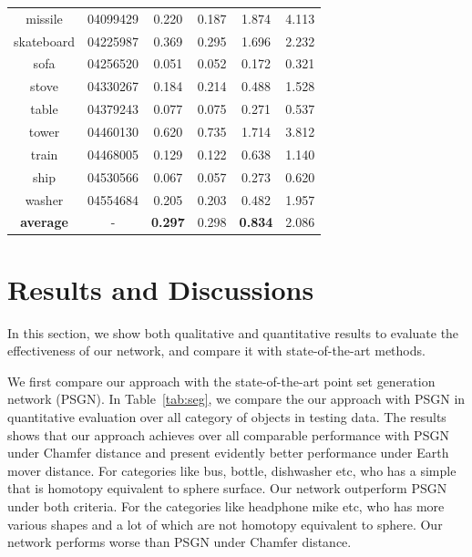 \begin{table}
\begin{tabular}{c c c c c c}
		missile & 04099429 & 0.220 & 0.187 & 1.874 & 4.113 \\
		skateboard & 04225987 & 0.369 & 0.295 & 1.696 & 2.232 \\
		sofa & 04256520 & 0.051 & 0.052 & 0.172 & 0.321 \\
		stove & 04330267 & 0.184 & 0.214 & 0.488 & 1.528 \\
		table & 04379243 & 0.077 & 0.075 & 0.271 & 0.537 \\
		tower & 04460130 & 0.620 & 0.735 & 1.714 & 3.812 \\
		train & 04468005 & 0.129 & 0.122 & 0.638 & 1.140 \\
		ship  & 04530566 & 0.067 & 0.057 & 0.273 & 0.620 \\
		washer &  04554684 & 0.205 & 0.203 & 0.482 & 1.957 \\
		\hline
		\textbf{average}   &     -     & \textbf{0.297} & 0.298 & \textbf{0.834} & 2.086\\
		\hline
	\end{tabular}
\end{table}

\section{Results and Discussions}

In this section, we show both qualitative and quantitative results to evaluate the effectiveness of our network, and compare it with state-of-the-art methods.

We first compare our approach with the state-of-the-art point set generation network (PSGN)\cite{PSGN}. 
In Table~\ref{tab:seg}, we compare the our approach with PSGN\cite{PSGN} in quantitative evaluation over all category of objects in testing data. 
The results shows that our approach achieves over all comparable performance with PSGN\cite{PSGN} under Chamfer distance and present evidently better performance under Earth mover distance.  For categories like bus, bottle, dishwasher etc, who has a simple that is homotopy equivalent to sphere surface. Our network outperform PSGN\cite{PSGN} under both criteria. For the categories like headphone mike etc, who has more various shapes and a lot of which are not homotopy equivalent to sphere. Our network performs worse than PSGN\cite{PSGN} under Chamfer distance.

